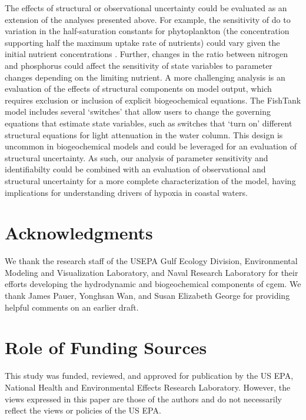 \documentclass[review]{elsarticle}\usepackage[]{graphicx}\usepackage[]{color}
\begin{document}
The effects of structural or observational uncertainty could be evaluated as an extension of the analyses presented above. For example, the sensitivity of \ac{do} to variation in the half-saturation constants for phytoplankton (the concentration supporting half the maximum uptake rate of nutrients) could vary given the initial nutrient concentrations \citep{Eppley69}. Further, changes in the ratio between nitrogen and phosphorus could affect the sensitivity of state variables to parameter changes depending on the limiting nutrient.  A more challenging analysis is an evaluation of the effects of structural components on model output, which requires exclusion or inclusion of explicit biogeochemical equations. The FishTank model includes several `switches' that allow users to change the governing equations that estimate state variables, such as switches that `turn on' different structural equations for light attenuation in the water column.  This design is uncommon in biogeochemical models and could be leveraged for an evaluation of structural uncertainty. As such, our analysis of parameter sensitivity and identifiabilty could be combined with an evaluation of observational and structural uncertainty for a more complete characterization of the model, having implications for understanding drivers of hypoxia in coastal waters.  

\section*{Acknowledgments}

We thank the research staff of the USEPA Gulf Ecology Division, Environmental Modeling and Visualization Laboratory, and Naval Research Laboratory for their efforts developing the hydrodynamic and biogeochemical components of \ac{cgem}. We thank James Pauer, Yonghsan Wan, and Susan Elizabeth George for providing helpful comments on an earlier draft.

\section*{Role of Funding Sources}

This study was funded, reviewed, and approved for publication by the US EPA, National Health and Environmental Effects Research Laboratory.  However, the views expressed in this paper are those of the authors and do not necessarily reflect the views or policies of the US EPA. 

\clearpage
\end{document}
